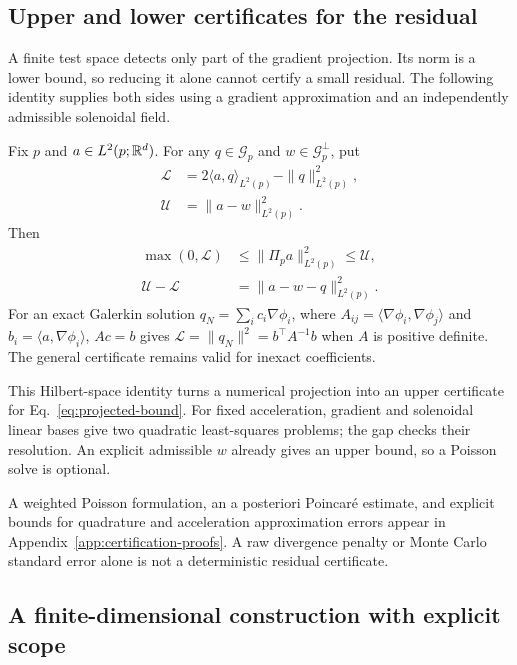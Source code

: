 \subsection{Upper and lower certificates for the residual}

A finite test space detects only part of the gradient projection.  Its norm
is a lower bound, so reducing it alone cannot certify a small residual.
The following identity supplies both sides using a gradient approximation
and an independently admissible solenoidal field.

\begin{proposition}
\label{prop:residual-certificates}
Fix $p$ and $a\in L^2(p;\mathbb R^d)$.  For any $q\in\mathcal G_p$ and
$w\in\mathcal G_p^\perp$, put
\begin{align*}
 \mathcal L&=2\langle a,q\rangle_{L^2(p)}-\|q\|_{L^2(p)}^2,\\
 \mathcal U&=\|a-w\|_{L^2(p)}^2.
\end{align*}
Then
\begin{align}
 \max(0,\mathcal L)&\le\|\Pi_pa\|_{L^2(p)}^2\le\mathcal U,\nonumber\\
 \mathcal U-\mathcal L&=\|a-w-q\|_{L^2(p)}^2.
 \label{eq:primal-dual-certificate}
\end{align}
For an exact Galerkin solution
$q_N=\sum_i c_i\nabla\phi_i$, where
$A_{ij}=\langle\nabla\phi_i,\nabla\phi_j\rangle$ and
$b_i=\langle a,\nabla\phi_i\rangle$, $Ac=b$ gives
$\mathcal L=\|q_N\|^2=b^\top A^{-1}b$ when $A$ is positive definite.
The general certificate remains valid for inexact coefficients.
\end{proposition}

This Hilbert-space identity turns a numerical projection into an upper
certificate for Eq.~\eqref{eq:projected-bound}.  For fixed acceleration,
gradient and solenoidal linear bases give two quadratic least-squares
problems; the gap checks their resolution.  An explicit admissible $w$
already gives an upper bound, so a Poisson solve is optional.

A weighted Poisson formulation, an a posteriori Poincar\'e estimate, and
explicit bounds for quadrature and acceleration approximation errors appear
in Appendix~\ref{app:certification-proofs}.  A raw divergence penalty or
Monte Carlo standard error alone is not a deterministic residual certificate.

\subsection{A finite-dimensional construction with explicit scope}

